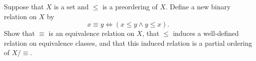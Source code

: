 \begin{problem}[9]
  Suppose that $X$ is a set and $\le$ is a preordering of $X$.
  Define a new binary relation on $X$ by
  \[ x \equiv y \iff (x \le y \land  y \le x). \]
  Show that $\equiv$ is an equivalence relation on $X$,
  that $\le$ induces a well-defined relation on equivalence classes,
  and that this induced relation is a partial ordering of $X/\equiv$.
  
\end{problem}
